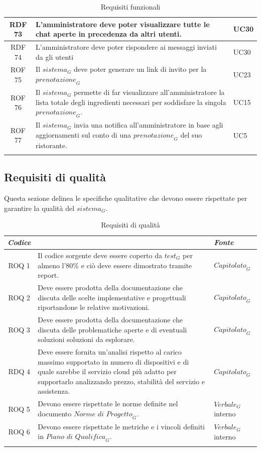 \documentclass[12pt, oneside]{article}
\begin{document}
\begin{longtable}{|c|p{14cm}|p{2cm}|}
    RDF 73 & L'amministratore deve poter visualizzare tutte le chat aperte in precedenza da altri utenti. & UC30 \\
    \hline
    RDF 74 & L'amministratore deve poter rispondere ai messaggi inviati da gli utenti & UC30 \\
    \hline
    ROF 75 & Il $\textit{sistema}_G$ deve poter generare un link di invito per la $\textit{prenotazione}_G$ & UC23 \\
    \hline
    ROF 76 & Il $\textit{sistema}_G$ permette di far visualizzare all'amministratore la lista totale degli ingredienti necessari per soddisfare la singola $\textit{prenotazione}_G$. & UC15 \\
     \hline
    ROF 77 & Il $\textit{sistema}_G$ invia una notifica all’amministratore in base agli
    aggiornamenti sul conto di una $\textit{prenotazione}_G$ del suo ristorante. & UC5 \\
     \hline
\caption{Requisiti funzionali}
\end{longtable}

\subsection{Requisiti di qualità}
Questa sezione delinea le specifiche qualitative che devono essere rispettate per garantire la qualità del $\textit{sistema}_G$.
\begin{longtable}{|c|p{14cm}|p{2cm}|}
    \hline
    \emph{Codice} & \centering{\emph{Descrizione}} &  \emph{Fonte} \\
    \hline
    \endfirsthead
    \endhead
    ROQ 1&  Il codice sorgente deve essere coperto da $\textit{test}_G$ per almeno l'80\% e ciò deve essere dimostrato tramite report. & $\textit{Capitolato}_G$ \\
    \hline
    ROQ 2 & Deve essere prodotta della documentazione che discuta delle scelte implementative e progettuali riportandone le relative motivazioni. & $\textit{Capitolato}_G$ \\
    \hline
    ROQ 3 & Deve essere prodotta della documentazione che discuta delle problematiche aperte e di eventuali soluzioni soluzioni da esplorare. & $\textit{Capitolato}_G$ \\
    \hline
    RDQ 4 & Deve essere fornita un'analisi rispetto al carico massimo supportato in numero di dispositivi e di quale sarebbe il servizio cloud più adatto per supportarlo analizzando prezzo, stabilità del servizio e assistenza. & $\textit{Capitolato}_G$ \\
    \hline
    ROQ 5 & Devono essere rispettate le norme definite nel documento $\textit{Norme di Progetto}_G$. & $\textit{Verbale}_G$ interno \\
    \hline
    ROQ 6 & Devono essere rispettate le metriche e i vincoli definiti in $\textit{Piano di Qualifica}_G$. & $\textit{Verbale}_G$ interno \\
    \hline
\caption{Requisiti di qualità}
\end{longtable}
    
\end{document}
